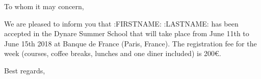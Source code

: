 \documentclass{letter}
\begin{document}
\begin{letter}{}
  
  \bigskip
  \bigskip
  \bigskip
  
\opening{To whom it may concern,}

\thispagestyle{fancy}

  \bigskip
  \bigskip
  \bigskip

We are pleased to inform you that :{FIRSTNAME}: :{LASTNAME}: has been accepted in the Dynare Summer School that will take place from June 11th to June 15th 2018 at Banque de France (Paris, France). The registration fee for the week (courses, coffee breaks, lunches and one diner included) is 200€.

  \bigskip
  \bigskip
  \bigskip
  \bigskip
  \bigskip
  \bigskip
  \bigskip
  
\closing{Best regards,\\
 \\
}

\end{letter}
\end{document}
